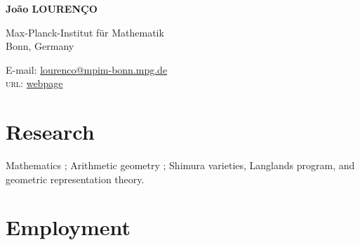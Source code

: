 \documentclass[12pt]{article} %
\begin{document}

{\LARGE\bfseries João LOURENÇO} %
\bigskip\bigskip\medskip %

Max-Planck-Institut für Mathematik\\ %
 Bonn, Germany
\medskip %


E-mail: \href{mailto:lourenco@mpim-bonn.mpg.de}{lourenco@mpim-bonn.mpg.de}\\ %
\textsc{url}: \href{https://rastrel.github.io/Lourenco/}{webpage}\\ %







\section*{Research}

Mathematics ; Arithmetic geometry ; Shimura varieties, Langlands program, and geometric representation theory. %


\section*{Employment}
\end{document}
